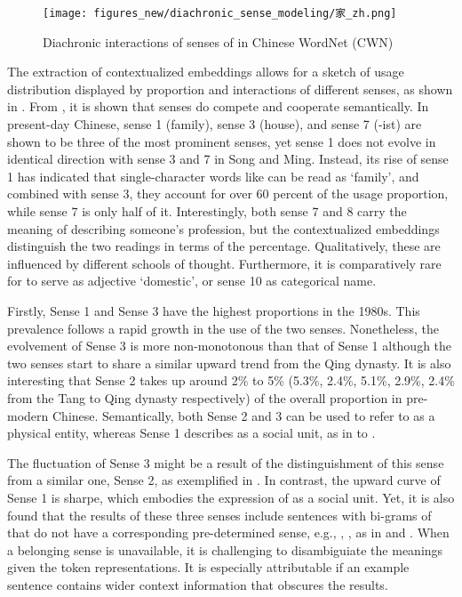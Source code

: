 \begin{figure}[H]
  \centering
  \texttt{[image: figures\_new/diachronic\_sense\_modeling/家\_zh.png]}
  \caption{Diachronic interactions of senses of \jia in Chinese WordNet (CWN)}
  \label{fig:jia_polynomial}
\end{figure}

The extraction of contextualized embeddings allows for a sketch of usage distribution displayed by proportion and interactions of different senses, as shown in . From , it is shown that senses do compete and cooperate semantically. In present-day Chinese, sense 1 (family), sense 3 (house), and sense 7 (-ist) are shown to be three of the most prominent senses, yet sense 1 does not evolve in identical direction with sense 3 and 7 in Song and Ming. Instead, its rise of sense 1 has indicated that single-character words like \jia can be read as `family', and combined with sense 3, they account for over 60 percent of the usage proportion, while sense 7 is only half of it. Interestingly, both sense 7 and 8 carry the meaning of describing someone's profession, but the contextualized embeddings distinguish the two readings in terms of the percentage. Qualitatively, these are influenced by different schools of thought. Furthermore, it is comparatively rare for \jia to serve as adjective `domestic', or sense 10 as categorical name.

Firstly, Sense 1 and Sense 3 have the highest proportions in the 1980s. This prevalence follows a rapid growth in the use of the two senses. Nonetheless, the evolvement of Sense 3 is more non-monotonous than that of Sense 1 although the two senses start to share a similar upward trend from the Qing dynasty. It is also interesting that Sense 2 takes up around 2\% to 5\% (5.3\%, 2.4\%, 5.1\%, 2.9\%, 2.4\% from the Tang to Qing dynasty respectively) of the overall proportion in pre-modern Chinese. Semantically, both Sense 2 and 3 can be used to refer to \jia as a physical entity, whereas Sense 1 describes \jia as a social unit, as in  to . 

The fluctuation of Sense 3 might be a result of the distinguishment of this sense from a similar one, Sense 2, as exemplified in .  In contrast, the upward curve of Sense 1 is sharpe, which embodies the expression of \jia as a social unit. Yet, it is also found that the results of these three senses include sentences with bi-grams of \jia that do not have a corresponding pre-determined sense, e.g., , , as in  and . When a belonging sense is unavailable, it is challenging to disambiguiate the meanings given the token representations. It is especially attributable if an example sentence contains wider context information that obscures the results.

